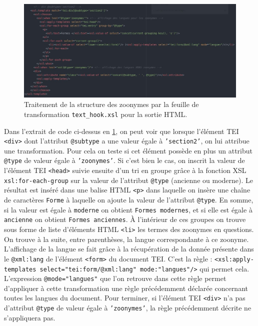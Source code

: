 \documentclass[a4paper,12pt,twoside]{book}
\begin{document}
\begin{figure}[H]
    \centering
    \includegraphics[width=\linewidth]{img/partie_2/zoonymes.JPG}
    \caption{Traitement de la structure des zoonymes par la feuille de transformation \texttt{text\_hook.xsl} pour la sortie \acrshort{HTML}.}
    \label{zoonymes}
\end{figure}

Dans l'extrait de code ci-dessus en \ref{zoonymes}, on peut voir que lorsque l'élément TEI \texttt{<div>} dont l'attribut \texttt{@subtype} a une valeur égale à \texttt{'section2'}, on lui attribue une transformation. Pour cela on teste si cet élément possède en plus un attribut \texttt{@type} de valeur égale à \texttt{'zoonymes'}. Si c'est bien le cas, on inscrit la valeur de l'élément TEI \texttt{<head>} suivie ensuite d'un tri en groupe grâce à la fonction \acrshort{XSL} \texttt{xsl:for-each-group} sur la valeur de l'attribut \texttt{@type} (\og ancienne\fg{} ou \og moderne\fg). Le résultat est inséré dans une balise \acrshort{HTML} \texttt{<p>} dans laquelle on insère une chaîne de caractères \texttt{Forme} à laquelle on ajoute la valeur de l'attribut \texttt{@type}. En somme, si la valeur est égale à \texttt{moderne} on obtient \texttt{Formes modernes}, et si elle est égale à \texttt{ancienne} on obtient \texttt{Formes anciennes}. À l'intérieur de ces groupes on trouve sous forme de liste d'éléments \acrshort{HTML} \texttt{<li>} les termes des zoonymes en questions. On trouve à la suite, entre parenthèses, la langue correspondante à ce zoonyme. L'affichage de la langue se fait grâce à la récupération de la donnée présente dans le \texttt{@xml:lang} de l'élément \texttt{<form>} du document TEI. C'est la règle : \texttt{<xsl:apply-templates select="tei:form/@xml:lang" mode:"langues"/>} qui permet cela. L'expression \texttt{@mode="langues"} que l'on retrouve dans cette règle permet d'appliquer à cette transformation une règle précédemment déclarée concernant toutes les langues du document. Pour terminer, si l'élément TEI \texttt{<div>} n'a pas d'attribut \texttt{@type} de valeur égale à \texttt{'zoonymes'}, la règle précédemment décrite ne s'appliquera pas.
\end{document}
